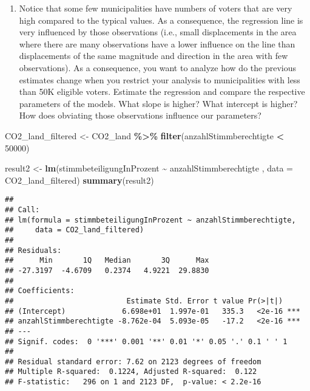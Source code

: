 \documentclass[
]{book}
\newenvironment{Shaded}{\begin{snugshade}}{\end{snugshade}}
\newcommand{\AttributeTok}[1]{\textcolor[rgb]{0.13,0.29,0.53}{#1}}
\newcommand{\DecValTok}[1]{\textcolor[rgb]{0.00,0.00,0.81}{#1}}
\newcommand{\FunctionTok}[1]{\textcolor[rgb]{0.13,0.29,0.53}{\textbf{#1}}}
\newcommand{\NormalTok}[1]{#1}
\newcommand{\OtherTok}[1]{\textcolor[rgb]{0.56,0.35,0.01}{#1}}
\newcommand{\SpecialCharTok}[1]{\textcolor[rgb]{0.81,0.36,0.00}{\textbf{#1}}}
\providecommand{\tightlist}{%
  \setlength{\itemsep}{0pt}\setlength{\parskip}{0pt}}
\begin{document}
\begin{enumerate}
\def\labelenumi{\alph{enumi}.}
\setcounter{enumi}{21}
\tightlist
\item
  Notice that some few municipalities have numbers of voters that are very high compared to the typical values. As a consequence, the regression line is very influenced by those observations (i.e., small displacements in the area where there are many observations have a lower influence on the line than displacements of the same magnitude and direction in the area with few observations). As a consequence, you want to analyze how do the previous estimates change when you restrict your analysis to municipalities with less than 50K eligible voters. Estimate the regression and compare the respective parameters of the models. What slope is higher? What intercept is higher? How does obviating those observations influence our parameters?
\end{enumerate}

\begin{Shaded}
\begin{Highlighting}[]
\NormalTok{CO2\_land\_filtered }\OtherTok{\textless{}{-}}\NormalTok{ CO2\_land }\SpecialCharTok{\%\textgreater{}\%} 
  \FunctionTok{filter}\NormalTok{(anzahlStimmberechtigte }\SpecialCharTok{\textless{}} \DecValTok{50000}\NormalTok{)}

\NormalTok{result2 }\OtherTok{\textless{}{-}} \FunctionTok{lm}\NormalTok{(stimmbeteiligungInProzent }\SpecialCharTok{\textasciitilde{}}\NormalTok{ anzahlStimmberechtigte , }\AttributeTok{data =}\NormalTok{ CO2\_land\_filtered)}
\FunctionTok{summary}\NormalTok{(result2)}
\end{Highlighting}
\end{Shaded}

\begin{verbatim}
## 
## Call:
## lm(formula = stimmbeteiligungInProzent ~ anzahlStimmberechtigte, 
##     data = CO2_land_filtered)
## 
## Residuals:
##      Min       1Q   Median       3Q      Max 
## -27.3197  -4.6709   0.2374   4.9221  29.8830 
## 
## Coefficients:
##                          Estimate Std. Error t value Pr(>|t|)    
## (Intercept)             6.698e+01  1.997e-01   335.3   <2e-16 ***
## anzahlStimmberechtigte -8.762e-04  5.093e-05   -17.2   <2e-16 ***
## ---
## Signif. codes:  0 '***' 0.001 '**' 0.01 '*' 0.05 '.' 0.1 ' ' 1
## 
## Residual standard error: 7.62 on 2123 degrees of freedom
## Multiple R-squared:  0.1224, Adjusted R-squared:  0.122 
## F-statistic:   296 on 1 and 2123 DF,  p-value: < 2.2e-16
\end{verbatim}
\end{document}
